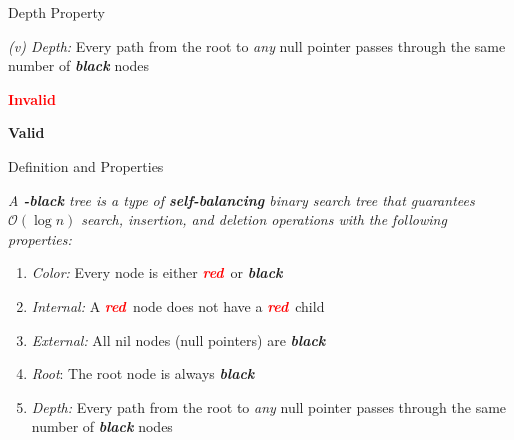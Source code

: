 \documentclass[aspectratio=169]{beamer}
\newcommand{\textib}[1]{\textit{\textbf{{#1}}}}
\newcommand{\red}{\textib{\textcolor{red}{red}}}
\newenvironment{define}{\begin{tcolorbox}[title={Definition}]\begin{small}}{\end{small}\end{tcolorbox}}
\begin{document}
\begin{frame}[fragile]{Depth Property}
    \vspace{-3em}

    \begin{minipage}[t][0.2\textheight][c]{\linewidth}
        \textit{(v) Depth:} Every path from the root to \textit{any} null pointer passes through the same number
        of \textib{black} nodes
    \end{minipage}
    \vspace{-3em}

    \begin{minipage}[t][0.6\textheight][c]{\linewidth}
         {
            \depthone
        }
         {\depthtwo}
         {\textbf{\textcolor{red}{Invalid}}}
        \vspace{1.1em}

         {\depththree}
         {
            \vspace{-2em}
            \textbf{Valid}
        }
    \end{minipage}
\end{frame}



\begin{frame}[fragile]{Definition and Properties}
    \begin{define}
        \it
        {
            A \textib{\color{red}{red}}\textib{-black} tree is a type of \textib{self-balancing} binary
            search tree that guarantees $\mathcal{O}(\log n)$ search, insertion, and deletion operations
            with the following properties:
        }
    \end{define}
    \begin{enumerate}[label=\textit{(\roman*)}]
        \item \textit{Color:} Every node is either \red \ or \textib{black}
        \item \textit{Internal:} A \red \ node does not have a \red \ child
        \item \textit{External:} All nil nodes (null pointers) are \textib{black}
        \item \textit{Root}: The root node is always \textib{black}
        \item \textit{Depth:} Every path from the root to \textit{any} null pointer passes through
            the same number of \textib{black} nodes
    \end{enumerate}
\end{frame}
\end{document}
